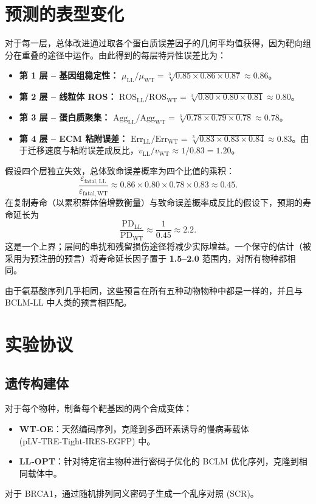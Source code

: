 \documentclass[12pt,a4paper]{article}
\begin{document}
	\section{预测的表型变化}
	\label{sec:predictions}
	对于每一层，总体改进通过取各个蛋白质误差因子的几何平均值获得，因为靶向组分在重叠的途径中运作。由此得到的每层特异性误差比为：
	
	\begin{itemize}
		\item \textbf{第 1 层 – 基因组稳定性：} \(\mu_{\mathrm{LL}}/\mu_{\mathrm{WT}} = \sqrt[3]{0.85\times0.86\times0.87} \approx 0.86\)。
		\item \textbf{第 2 层 – 线粒体 ROS：} \(\mathrm{ROS}_{\mathrm{LL}}/\mathrm{ROS}_{\mathrm{WT}} = \sqrt[3]{0.80\times0.80\times0.81} \approx 0.80\)。
		\item \textbf{第 3 层 – 蛋白质聚集：} \(\mathrm{Agg}_{\mathrm{LL}}/\mathrm{Agg}_{\mathrm{WT}} = \sqrt[3]{0.78\times0.79\times0.78} \approx 0.78\)。
		\item \textbf{第 4 层 – ECM 粘附误差：} \(\mathrm{Err}_{\mathrm{LL}}/\mathrm{Err}_{\mathrm{WT}} = \sqrt[3]{0.83\times0.83\times0.84} \approx 0.83\)。由于迁移速度与粘附误差成反比，\(v_{\mathrm{LL}}/v_{\mathrm{WT}} \approx 1/0.83 = 1.20\)。
	\end{itemize}
	
	假设四个层独立失效，总体致命误差概率为四个比值的乘积：
	\[
	\frac{\varepsilon_{\mathrm{fatal,LL}}}{\varepsilon_{\mathrm{fatal,WT}}} \approx 0.86 \times 0.80 \times 0.78 \times 0.83 \approx 0.45.
	\]
	在复制寿命（以累积群体倍增数衡量）与致命误差概率成反比的假设下，预期的寿命延长为
	\[
	\frac{\mathrm{PD}_{\mathrm{LL}}}{\mathrm{PD}_{\mathrm{WT}}} \approx \frac{1}{0.45} \approx 2.2.
	\]
	这是一个上界；层间的串扰和残留损伤途径将减少实际增益。一个保守的估计（被采用为预注册的预言）将寿命延长因子置于 \textbf{1.5–2.0} 范围内，对所有物种都相同。
	
	由于氨基酸序列几乎相同，这些预言在所有五种动物物种中都是一样的，并且与 BCLM‑LL 中人类的预言相匹配。
	
	\section{实验协议}
	\label{sec:protocol}
	
	\subsection{遗传构建体}
	对于每个物种，制备每个靶基因的两个合成变体：
	\begin{itemize}
		\item \textbf{WT‑OE}：天然编码序列，克隆到多西环素诱导的慢病毒载体 (pLV‑TRE‑Tight‑IRES‑EGFP) 中。
		\item \textbf{LL‑OPT}：针对特定宿主物种进行密码子优化的 BCLM 优化序列，克隆到相同载体中。
	\end{itemize}
	对于 BRCA1，通过随机排列同义密码子生成一个乱序对照 (SCR)。
	
\end{document}
